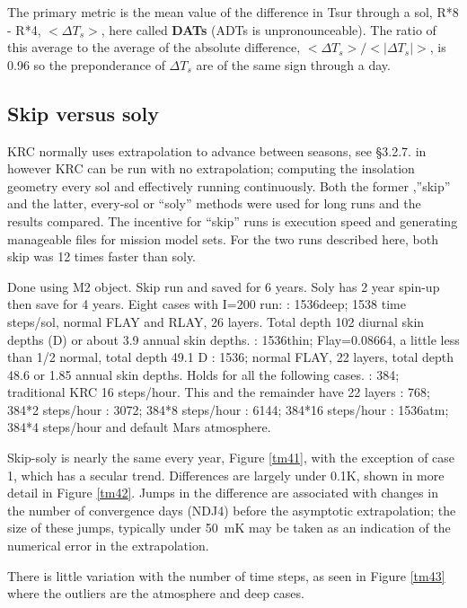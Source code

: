 \documentclass{article}  %
\begin{document}
The primary metric is the mean value of the difference in Tsur through a sol,
R*8 - R*4, $< \Delta T_s> $, here called \textbf{DATs} (ADTs is
unpronounceable).  The ratio of this average to the average of the absolute
difference, $< \Delta T_s> /< | \Delta T_s | >$, is 0.96 so the preponderance of
$\Delta T_s$ are of the same sign through a day.

\subsection{Skip versus soly  \label{skso}} %
KRC normally uses extrapolation to advance between seasons, see \S 3.2.7. in
\cite{Kieffer12} however KRC can be run with no extrapolation; computing the
insolation geometry every sol and effectively running continuously. Both the
former ,''skip'' and the latter, every-sol or ``soly'' methods were used for
long runs and the results compared. The incentive for ``skip'' runs is execution
speed and generating manageable files for mission model sets. For the two runs
described here, both skip was 12 times faster than soly.

Done using M2 object. Skip run and saved for 6 years. Soly has 2 year spin-up then save for 4 years.  Eight cases with I=200 run:
: 1536deep; 1538 time steps/sol, normal FLAY and RLAY, 26 layers. Total depth 102 diurnal skin depths (D) or about 3.9 annual skin depths.
: 1536thin; Flay=0.08664, a little less than 1/2 normal, total depth 49.1 D
: 1536; normal FLAY, 22 layers, total depth 48.6 or 1.85 annual skin depths.
\qii  Holds for all the following cases. 
: 384; traditional KRC 16 steps/hour.  This and the remainder have 22 layers
: 768; 384*2 steps/hour
: 3072; 384*8 steps/hour
: 6144; 384*16 steps/hour
: 1536atm; 384*4 steps/hour and default Mars atmosphere.

Skip-soly is nearly the same every year, Figure \ref{tm41}, with the exception
of case 1, which has a secular trend. Differences are largely under 0.1K, shown
in more detail in Figure \ref{tm42}. Jumps in the difference are associated with
changes in the number of convergence days (NDJ4) before the asymptotic
extrapolation; the size of these jumps, typically under 50~mK may be taken as an
indication of the numerical error in the extrapolation.

There is little variation with the number of time steps, as seen in Figure
\ref{tm43} where the outliers are the atmosphere and deep cases.
\end{document}
